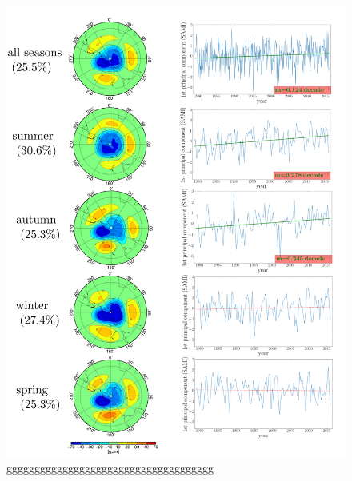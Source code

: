 \begin{figure}
	\centering
	\includegraphics[scale=0.14]{pictures/EOF_PC_IERA.png}
	\caption{ggggggggggggggggggggggggggggggggggggg}\label{fig:eof_iera}
\end{figure}